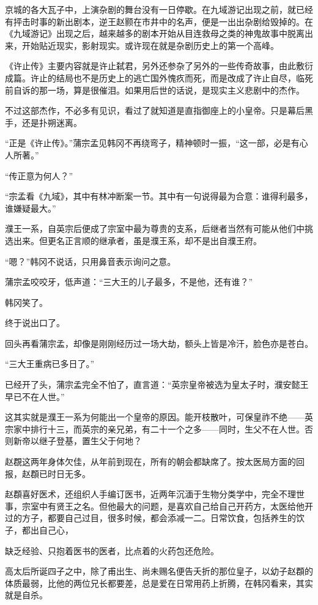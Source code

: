 京城的各大瓦子中，上演杂剧的舞台没有一日停歇。在九域游记出现之前，就已经有抨击时事的新出剧本，逆王赵颢在市井中的名声，便是一出出杂剧给毁掉的。在《九域游记》出现之后，越来越多的剧本开始从目连救母之类的神鬼故事中脱离出来，开始贴近现实，影射现实。或许现在就是杂剧历史上的第一个高峰。

《许止传》主要内容就是许止弑君，另外还参杂了另外的一些传奇故事，由此敷衍成篇。许止的结局也不是历史上的逃亡国外愧疚而死，而是改成了许止自尽，临死前自诉的那一场，算是很催泪。如果用后世的话说，是现实主义悲剧中的杰作。

不过这部杰作，不必多有见识，看过了就知道是直指御座上的小皇帝。只是幕后黑手，还是扑朔迷离。

“正是《许止传》。”蒲宗孟见韩冈不再绕弯子，精神顿时一振，“这一部，必是有心人所著。”

“传正意为何人？”

“宗孟看《九域》，其中有林冲断案一节。其中有一句说得最为合意：谁得利最多，谁嫌疑最大。”

濮王一系，自英宗后便成了宗室中最为尊贵的支系，后继者当然有可能从他们中挑选出来。但更名正言顺的继承者，虽是濮王系，却不是出自濮王府。

“嗯？”韩冈不说话，只用鼻音表示询问之意。

蒲宗孟咬咬牙，低声道：“三大王的儿子最多，不是他，还有谁？”

韩冈笑了。

终于说出口了。

回头再看蒲宗孟，却像是刚刚经历过一场大劫，额头上皆是冷汗，脸色亦是苍白。

“三大王重病已多日了。”

已经开了头，蒲宗孟完全不怕了，直言道：“英宗皇帝被选为皇太子时，濮安懿王早已不在人世。”

这其实就是濮王一系为何能出一个皇帝的原因。能开枝散叶，可保皇祚不绝——英宗家中排行十三，而英宗的亲兄弟，有二十一个之多——同时，生父不在人世。否则新帝以继子登基，置生父于何地？

赵覠这两年身体欠佳，从年前到现在，所有的朝会都缺席了。按太医局方面的回报，赵頵已时日无多。

赵頵喜好医术，还组织人手编订医书，近两年沉湎于生物分类学中，完全不理世事，宗室中有贤王之名。但他最大的问题，是喜欢自己给自己开药方，太医给他开过的方子，都要自己过目，很多时候，都会添减一二。日常饮食，包括养生的饮子，都出自己心，

缺乏经验、只抱着医书的医者，比点着的火药包还危险。

高太后所诞四子之中，除了甫出生、尚未赐名便告夭折的那位皇子，以幼子赵頵的体质最弱，比他的两位兄长都要差，总是爱在日常用药上折腾，在韩冈看来，其实就是自杀。


